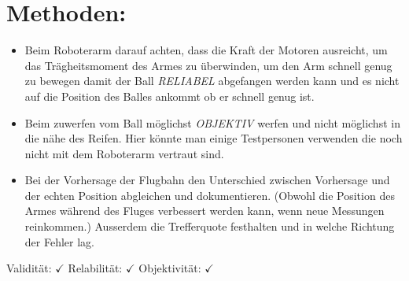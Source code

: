 \documentclass{article}
\begin{document}
\section*{Methoden:}


\begin{itemize}
	\item Beim Roboterarm darauf achten, dass die Kraft der Motoren ausreicht, um das Trägheitsmoment des Armes zu überwinden, um den Arm schnell genug zu bewegen damit der Ball \emph{RELIABEL} abgefangen werden kann und es nicht auf die Position des Balles ankommt ob er schnell genug ist.
	\item Beim zuwerfen vom Ball möglichst \emph{OBJEKTIV} werfen und nicht möglichst in die nähe des Reifen. Hier könnte man einige Testpersonen verwenden die noch nicht mit dem Roboterarm vertraut sind.
	\item Bei der Vorhersage der Flugbahn den Unterschied zwischen Vorhersage und der echten Position abgleichen und dokumentieren. (Obwohl die Position des Armes während des Fluges verbessert werden kann, wenn neue Messungen reinkommen.) Ausserdem die Trefferquote festhalten und in welche Richtung der Fehler lag.
\end{itemize}



{\large Validität: $\checkmark$}
{\large Relabilität: $\checkmark$}
{\large Objektivität: $\checkmark$}



\end{document}
